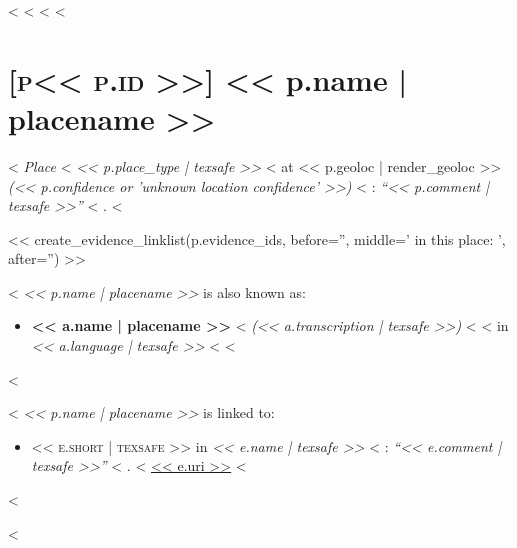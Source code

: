 <%
<%
<%
<%
\section*{\hypertarget{place<<p.id>>}{\textsc{[p<< p.id >>]} << p.name | placename >>}}

<%
  \emph{Place}
<%
  \emph{<< p.place_type | texsafe >>}
<%
at
<< p.geoloc | render_geoloc >>
\emph{(<< p.confidence or 'unknown location confidence' >>)}
<%
: \emph{\enquote{<< p.comment | texsafe >>}}
<%
.
<%


<< create_evidence_linklist(p.evidence_ids, before='', middle=' in this place: ', after='') >>

<%
  \emph{<< p.name | placename >>} is also known as:

  \begin{itemize}
    <%
    \item
      \textbf{<< a.name | placename >>}
      <%
      \emph{(<< a.transcription | texsafe >>)}
      <%
      <%
      in
      \emph{<< a.language | texsafe >>}
      <%
    <%
  \end{itemize}
<%

<%
  \emph{<< p.name | placename >>} is linked to:

  \begin{itemize}
    <%
    \item
      \textsc{<< e.short | texsafe >>} in
      \emph{<< e.name | texsafe >>}
      <%
      : \emph{\enquote{<< e.comment | texsafe >>}}
      <%
      .
      <%
      \url{<< e.uri >>}
    <%
  \end{itemize}
<%

<%
